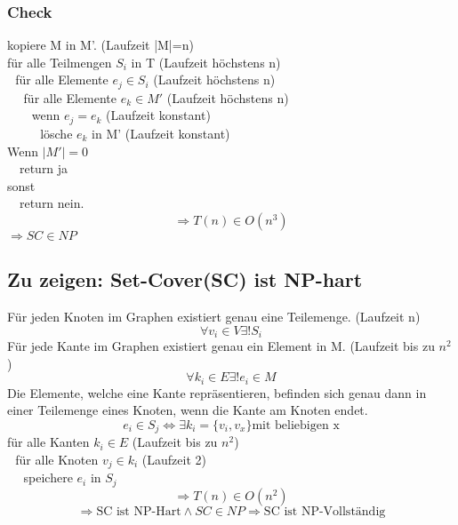 \documentclass[a4paper,11pt,twoside]{article}
\begin{document}
\subsubsection*{Check}
kopiere M in M'. (Laufzeit |M|=n)\\
für alle Teilmengen $S_i$ in T (Laufzeit höchstens n)\\
$~~~$für alle Elemente $e_j\in S_i$ (Laufzeit höchstens n)\\
$~~~~~~$für alle Elemente $e_k\in M'$ (Laufzeit höchstens n)\\
$~~~~~~~~~$wenn $e_j = e_k$ (Laufzeit konstant)\\
$~~~~~~~~~~~~$lösche $e_k$ in M' (Laufzeit konstant)\\
Wenn $|M'|=0$ \\
$~~~$ return ja \\
sonst\\
$~~~$ return nein.
\[\Rightarrow T(n)\in O(n^3)\]
$\Rightarrow SC\in NP$
\subsection*{Zu zeigen: Set-Cover(SC) ist NP-hart}
Für jeden Knoten im Graphen existiert genau eine Teilemenge. (Laufzeit n)
\[\forall v_i \in V \exists! S_i\]
Für jede Kante im Graphen existiert genau ein Element in M. (Laufzeit bis zu $n^2$)
\[\forall k_i \in E \exists! e_i \in M\]
Die Elemente, welche eine Kante repräsentieren, befinden sich genau dann in einer Teilemenge eines Knoten, wenn die Kante am Knoten endet.
\[e_i\in S_j \Leftrightarrow \exists k_i=\{v_i,v_x\} \text{mit beliebigen x}\]
für alle Kanten $k_i\in E$ (Laufzeit bis zu $n^2$)\\
$~~~$für alle Knoten $v_j\in k_i$ (Laufzeit 2)\\
$~~~~~~$speichere $e_i$ in $S_j$
\[\Rightarrow T(n)\in O(n^2)\]
\[\Rightarrow \text{SC ist NP-Hart} \land SC\in NP \Rightarrow \text{SC ist NP-Vollständig}\]
\end{document}
